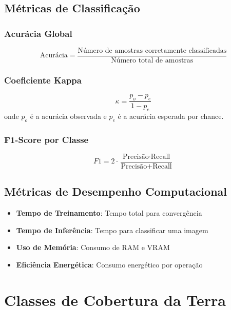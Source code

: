 \subsection{Métricas de Classificação}
\subsubsection{Acurácia Global}
\begin{equation}
\text{Acurácia} = \frac{\text{Número de amostras corretamente classificadas}}{\text{Número total de amostras}}
\end{equation}

\subsubsection{Coeficiente Kappa}
\begin{equation}
\kappa = \frac{p_o - p_e}{1 - p_e}
\end{equation}
onde $p_o$ é a acurácia observada e $p_e$ é a acurácia esperada por chance.

\subsubsection{F1-Score por Classe}
\begin{equation}
F1 = 2 \cdot \frac{\text{Precisão} \cdot \text{Recall}}{\text{Precisão} + \text{Recall}}
\end{equation}

\subsection{Métricas de Desempenho Computacional}
\begin{itemize}
    \item \textbf{Tempo de Treinamento}: Tempo total para convergência
    \item \textbf{Tempo de Inferência}: Tempo para classificar uma imagem
    \item \textbf{Uso de Memória}: Consumo de RAM e VRAM
    \item \textbf{Eficiência Energética}: Consumo energético por operação
\end{itemize}

\section{Classes de Cobertura da Terra}\label{sec:classes}

